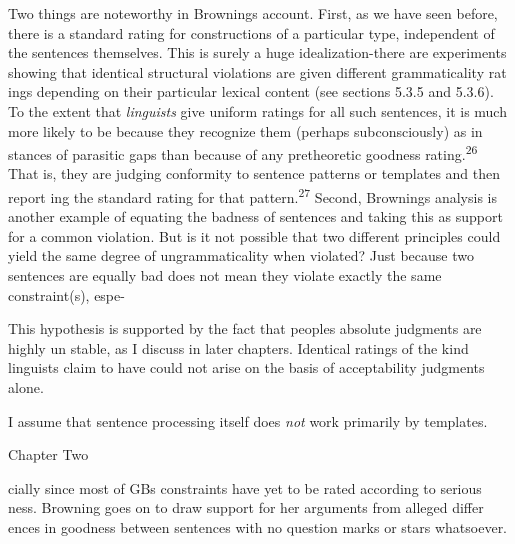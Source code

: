 \begin{styleTextbody}
Two things are noteworthy in Browning{\textquotesingle}s account. First, as we have seen before, there is a standard rating for constructions of a particular type, independent of the sentences themselves. This is surely a huge idealization-there are experiments showing that identical structural violations are given different grammaticality rat\- ings depending on their particular lexical content (see sections 5.3.5 and 5.3.6). To the extent that \textit{linguists}\textit{ }give uniform ratings for all such sentences, it is much more likely to be because they recognize them (perhaps subconsciously) as in\- stances of parasitic gaps than because of any pretheoretic goodness rating.\textsuperscript{26}\textsuperscript{ }That is, they are judging conformity to sentence patterns or templates and then report\- ing the standard rating for that pattern.\textsuperscript{27}\textsuperscript{ }Second, Browning{\textquotesingle}s analysis is another example of equating the badness of sentences and taking this as support for a common violation. But is it not possible that two different principles could yield the same degree of ungrammaticality when violated? Just because two sentences are equally bad does not mean they violate exactly the same constraint(s), espe-
\end{styleTextbody}


\setcounter{listWWNumlxleveli}{14}
\begin{listWWNumlxleveli}
\item 
\begin{styleStandard}
This hypothesis is supported by the fact that people{\textquotesingle}s absolute judgments are highly un\- stable, as I discuss in later chapters. Identical ratings of the kind linguists claim to have could not arise on the basis of acceptability judgments alone.
\end{styleStandard}


\item 
\begin{styleStandard}
I assume that sentence processing itself does \textit{not}\textit{ }work primarily by templates.
\end{styleStandard}


\end{listWWNumlxleveli}
\clearpage\setcounter{page}{1}\begin{styleStandard}
Chapter Two
\end{styleStandard}


\begin{styleStandard}
cially since most of GB{\textquotesingle}s constraints have yet to be rated according to serious\- ness. Browning goes on to draw support for her arguments from alleged differ\- ences in goodness between sentences with no question marks or stars whatsoever.
\end{styleStandard}


